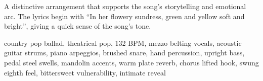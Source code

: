 

\begin{notes}
A distinctive arrangement that supports the song's storytelling and emotional arc. %
The lyrics begin with “In her flowery sundress, green and yellow soft and bright”, giving a quick sense of the song’s tone.
\end{notes}

\begin{style}
country pop ballad, theatrical pop, 132 BPM, mezzo belting vocals, acoustic guitar strums, piano arpeggios, brushed snare, hand percussion, upright bass, pedal steel swells, mandolin accents, warm plate reverb, chorus lifted hook, swung eighth feel, bittersweet vulnerability, intimate reveal
\end{style}

